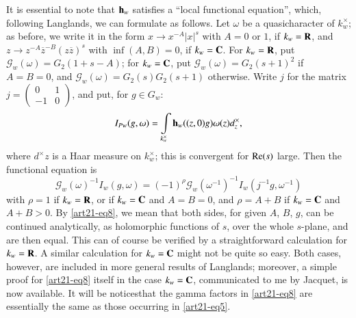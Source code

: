 It is essential to note that $\mathbf{h}_{w}$ satisfies a ``local functional equation'', which, following Langlands, we can formulate as follows. Let $\omega$ be a quasicharacter of $k^{\times}_{w}$; as before, we write it in the form $x\to x^{-A}|x|^{s}$ with $A=0$ or $1$, if $k_{w}=\mathbf{R}$, and $z\to z^{-A}\overline{z}^{-B}(z\overline{z})^{s}$ with $\inf(A,B)=0$, if $k_{w}=\mathbf{C}$. For $k_{w}=\mathbf{R}$, put $\mathscr{G}_{w}(\omega)=G_{2}(1+s-A)$; for $k_{w}=\mathbf{C}$, put $\mathscr{G}_{w}(\omega)=G_{2}(s+1)^{2}$ if $A=B=0$, and $\mathscr{G}_{w}(\omega)=G_{2}(s)G_{2}(s+1)$ otherwise. Write $j$ for the matrix $j=\left(\begin{smallmatrix} 0 & 1\\ -1 & 0\end{smallmatrix}\right)$, and put, for $g\in G_{w}$:
\begin{equation}
I_{Pw}(g,\omega)=\int\limits_{k^{\times}_{w}}\mathbf{h}_{w}((z,0)g)\omega(z)d^{\times}_{z},\label{art21-eq7}
\end{equation}
where $d^{\times}z$ is a Haar measure on $k^{\times}_{w}$; this is convergent for $\operatorname{\mathrm{Re}}(s)$ large. Then the functional equation is
\begin{equation}
\mathscr{G}_{w}(\omega)^{-1}I_{w}(g,\omega)=(-1)^{\rho}\mathscr{G}_{w}(\omega^{-1})^{-1}I_{w}(j^{-1}g,\omega^{-1})\label{art21-eq8}
\end{equation}
with $\rho=1$ if $k_{w}=\mathbf{R}$, or if $k_{w}=\mathbf{C}$ and $A=B=0$, and $\rho=A+B$ if $k_{w}=\mathbf{C}$ and $A+B>0$. By \eqref{art21-eq8}, we mean that both sides, for given $A$, $B$, $g$, can be continued analytically, as holomorphic functions of $s$, over the whole $s$-plane, and are then equal. This can of course be verified by a straightforward calculation for $k_{w}=\mathbf{R}$. A similar calculation for $k_{w}=\mathbf{C}$ might not be quite so easy. Both cases, however, are included in more general results of Langlands; moreover, a simple proof for \eqref{art21-eq8} itself in the case $k_{w}=\mathbf{C}$, communicated to me by Jacquet, is now available. It will be notices\pageoriginale that the gamma factors in \eqref{art21-eq8} are essentially the same as those occurring in \eqref{art21-eq5}.

